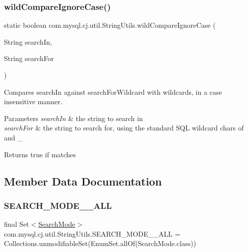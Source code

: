 \subsubsection{\texorpdfstring{wild\+Compare\+Ignore\+Case()}{wildCompareIgnoreCase()}}
{\footnotesize\ttfamily static boolean com.\+mysql.\+cj.\+util.\+String\+Utils.\+wild\+Compare\+Ignore\+Case (\begin{DoxyParamCaption}\item[{String}]{search\+In,  }\item[{String}]{search\+For }\end{DoxyParamCaption})\hspace{0.3cm}{\ttfamily [static]}}

Compares search\+In against search\+For\+Wildcard with wildcards, in a case insensitive manner.


\begin{DoxyParams}{Parameters}
{\em search\+In} & the string to search in \\
\hline
{\em search\+For} & the string to search for, using the \textquotesingle{}standard\textquotesingle{} S\+QL wildcard chars of \textquotesingle{}\textquotesingle{} and \textquotesingle{}\+\_\+\textquotesingle{} \\
\hline
\end{DoxyParams}
\begin{DoxyReturn}{Returns}
true if matches 
\end{DoxyReturn}


\subsection{Member Data Documentation}
\mbox{\label{classcom_1_1mysql_1_1cj_1_1util_1_1_string_utils_a58f73e83944e15181d667036572ebfed}} 
\subsubsection{\texorpdfstring{S\+E\+A\+R\+C\+H\+\_\+\+M\+O\+D\+E\+\_\+\+\_\+\+A\+LL}{SEARCH\_MODE\_\_ALL}}
{\footnotesize\ttfamily final Set$<$\mbox{\hyperlink{enumcom_1_1mysql_1_1cj_1_1util_1_1_string_utils_1_1_search_mode}{Search\+Mode}}$>$ com.\+mysql.\+cj.\+util.\+String\+Utils.\+S\+E\+A\+R\+C\+H\+\_\+\+M\+O\+D\+E\+\_\+\+\_\+\+A\+LL = Collections.\+unmodifiable\+Set(Enum\+Set.\+all\+Of(Search\+Mode.\+class))\hspace{0.3cm}{\ttfamily [static]}}

